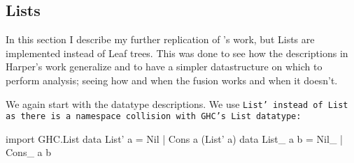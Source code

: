 \long{}
\subsection{Lists}
In this section I describe my further replication of \cite{Harper2011}'s work, but Lists are implemented instead of Leaf trees.
This was done to see how the descriptions in Harper's work generalize and to have a simpler datastructure on which to perform analysis; seeing how and when the fusion works and when it doesn't.

We again start with the datatype descriptions. We use \tt{List'} instead of \tt{List} as there is a namespace collision with GHC's \tt{List} datatype:
\begin{code}
import GHC.List
data List' a = Nil | Cons a (List' a)
data List_ a b = Nil_ | Cons_ a b
\end{code}
